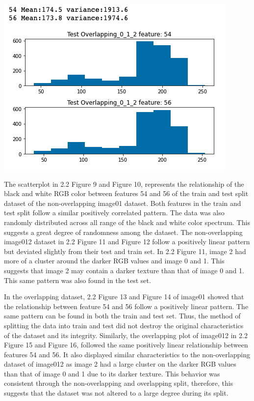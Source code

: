 \documentclass[12pt]{article}
\begin{document}
\begin{multicols*}{2}
\begin{center}
		\includegraphics[scale=0.3]{../screenshot/test_over_012.png}
		
	\end{center}

  \hspace*{10mm} The scatterplot in 2.2 Figure 9 and Figure 10, represents the relationship of the black and white RGB color between features 54 and 56 of the train
  and test split dataset of the non-overlapping image01 dataset. Both features in the train and test split follow a similar positively correlated pattern.
  The data was also randomly distributed across all range of the black and white color spectrum. This suggests a great degree of randomness among the dataset.
  The non-overlapping image012 dataset in 2.2 Figure 11 and Figure 12 follow a positively linear pattern but deviated slightly from their test and train set. 
  In 2.2 Figure 11, image 2 had more of a cluster around the darker RGB values and image 0 and 1. This suggests that image 2 may contain a darker texture than that of
  image 0 and 1. This same pattern was also found in the test set. 

  \hspace*{10mm} In the overlapping dataset, 2.2 Figure 13 and Figure 14 of image01 showed that the relationship between feature 54 and 56 follow a positively linear pattern.
  The same pattern can be found in both the train and test set. Thus, the method of splitting the data into train and test did not destroy the original characteristics
  of the dataset and its integrity. Similarly, the overlapping plot of image012 in 2.2 Figure 15 and Figure 16, followed the same positively linear relationship
  between features 54 and 56. It also displayed similar characteristics to the non-overlapping dataset of image012 as image 2 had a large cluster on the darker RGB 
  values than that of image 0 and 1 due to its darker texture. This behavior was consistent through the non-overlapping and overlapping split, therefore, this suggests
  that the dataset was not altered to a large degree during its split. 


\end{multicols*}
\end{document}
